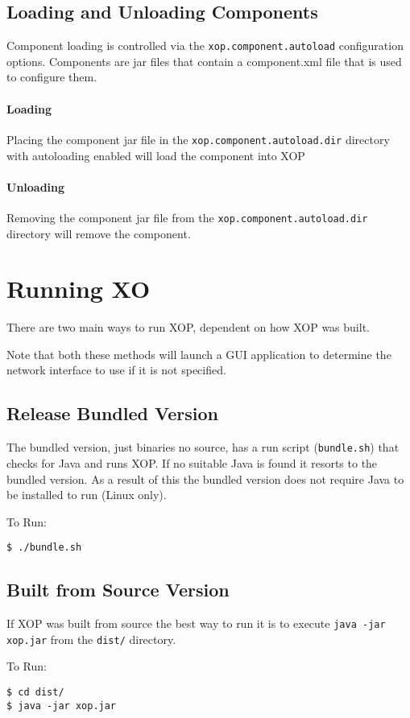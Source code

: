\documentclass[draft]{article}
\begin{document}
\subsection{Loading and Unloading Components}
Component loading is controlled via the \texttt{xop.component.autoload} configuration options. Components are jar files that contain a component.xml file that is used to configure them. 

\paragraph{Loading}
Placing the component jar file in the \texttt{xop.component.autoload.dir} directory with autoloading enabled will load the component into XOP
\paragraph{Unloading}
Removing the component jar file from the 
\texttt{xop.component.autoload.dir} directory will remove the component.

\section{Running XO}
There are two main ways to run XOP, dependent on how XOP was built.

Note that both these methods will launch a GUI application to determine the network interface to use if it is not specified.
\subsection{Release Bundled Version}
The bundled version, just binaries no source, has a run script (\texttt{bundle.sh}) that checks for Java and runs XOP. If no suitable Java is found it resorts to the bundled version. As a result of this the bundled version does not require Java to be installed to run (Linux only).

To Run:
\begin{verbatim}
$ ./bundle.sh
\end{verbatim}
\subsection{Built from Source Version}
If XOP was built from source the best way to run it is to execute \texttt{java -jar xop.jar} from the \texttt{dist/} directory.

To Run:
\begin{verbatim}
$ cd dist/
$ java -jar xop.jar
\end{verbatim}
\end{document}
